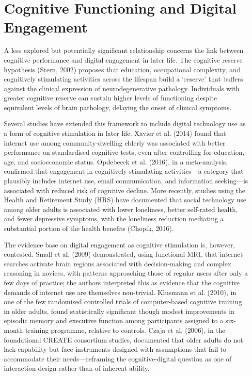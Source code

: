\section{Cognitive Functioning and Digital Engagement}
A less explored but potentially significant relationship concerns the link between cognitive performance and digital engagement in later life. The cognitive reserve hypothesis (Stern, 2002) proposes that education, occupational complexity, and cognitively stimulating activities across the lifespan build a `reserve' that buffers against the clinical expression of neurodegenerative pathology. Individuals with greater cognitive reserve can sustain higher levels of functioning despite equivalent levels of brain pathology, delaying the onset of clinical symptoms.

Several studies have extended this framework to include digital technology use as a form of cognitive stimulation in later life. Xavier et al. (2014) found that internet use among community-dwelling elderly was associated with better performance on standardised cognitive tests, even after controlling for education, age, and socioeconomic status. Opdebeeck et al. (2016), in a meta-analysis, confirmed that engagement in cognitively stimulating activities---a category that plausibly includes internet use, email communication, and information seeking---is associated with reduced risk of cognitive decline. More recently, studies using the Health and Retirement Study (HRS) have documented that social technology use among older adults is associated with lower loneliness, better self-rated health, and fewer depressive symptoms, with the loneliness reduction mediating a substantial portion of the health benefits (Chopik, 2016).

The evidence base on digital engagement as cognitive stimulation is, however, contested. Small et al. (2009) demonstrated, using functional MRI, that internet searches activate brain regions associated with decision-making and complex reasoning in novices, with patterns approaching those of regular users after only a few days of practice; the authors interpreted this as evidence that the cognitive demands of internet use are themselves non-trivial. Klusmann et al. (2010), in one of the few randomised controlled trials of computer-based cognitive training in older adults, found statistically significant though modest improvements in episodic memory and executive function among participants assigned to a six-month training programme, relative to controls. Czaja et al. (2006), in the foundational CREATE consortium studies, documented that older adults do not lack capability but face instruments designed with assumptions that fail to accommodate their needs---reframing the cognitive-digital question as one of interaction design rather than of inherent ability.

